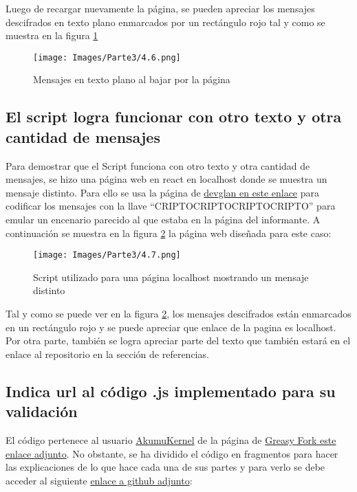 \documentclass[letter,12pt]{article}
\begin{document}
Luego de recargar nuevamente la página, se pueden apreciar los mensajes descifrados en texto plano enmarcados por un rectángulo rojo tal y como se muestra en la figura \ref{fig:Mensajesentextoplano}

\begin{figure}[H]
    \centering
    \texttt{[image: Images/Parte3/4.6.png]}
    \caption{Mensajes en texto plano al bajar por la página}
    \label{fig:Mensajesentextoplano}
\end{figure}

\subsection{El script logra funcionar con otro texto y otra cantidad de mensajes}

Para demostrar que el Script funciona con otro texto y otra cantidad de mensajes, se hizo una página web en react en localhost donde se muestra un mensaje distinto. Para ello se usa la página de \href{https://www.devglan.com/online-tools/triple-des-encrypt-decrypt}{devglan en este enlace} para codificar los mensajes con la llave ``CRIPTOCRIPTOCRIPTOCRIPTO'' para emular un encenario parecido al que estaba en la página del informante. A continuación se muestra en la figura \ref{fig:localhost} la página web diseñada para este caso:

\begin{figure}[H]
    \centering
    \texttt{[image: Images/Parte3/4.7.png]}
    \caption{Script utilizado para una página localhost mostrando un mensaje distinto}
    \label{fig:localhost}
\end{figure}

\clearpage

Tal y como se puede ver en la figura \ref{fig:localhost}, los mensajes descifrados están enmarcados en un rectángulo rojo y se puede apreciar que enlace de la pagina es localhost. Por otra parte, también se logra apreciar parte del texto que también estará en el enlace al repositorio en la sección de referencias.

\subsection{Indica url al código .js implementado para su validación}

El código pertenece al usuario \href{https://greasyfork.org/es/users/1214768-akumukernel}{AkumuKernel} de la página de  \href{https://greasyfork.org/es/scripts/479454-cryptojs/code}{Greasy Fork este enlace adjunto}. No obstante, se ha dividido el código en fragmentos para hacer las explicaciones de lo que hace cada una de sus partes y para verlo se debe acceder al siguiente \href{}{enlace a github adjunto}:
\end{document}
